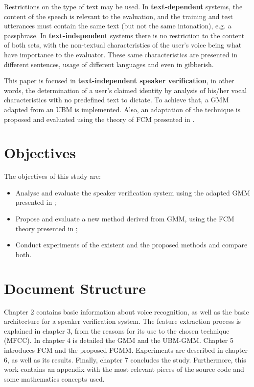 Restrictions on the type of text may be used. In \textbf{text-dependent} systems, the content of the speech is relevant to the evaluation, and the training and test utterances must contain the same text (but not the same intonation), e.g. a passphrase. In \textbf{text-independent} systems there is no restriction to the content of both sets, with the non-textual characteristics of the user's voice being what have importance to the evaluator. These same characteristics are presented in different sentences, usage of different languages and even in gibberish.

This paper is focused in \textbf{text-independent speaker verification}, in other words, the determination of a user's claimed identity by analysis of his/her vocal characteristics with no predefined text to dictate. To achieve that, a GMM adapted from an UBM \autocite{reynolds.quatieri.dunn.2000} is implemented. Also, an adaptation of the technique is proposed and evaluated using the theory of FCM presented in \autocite{gao.zhou.pu.2013}.

\section{Objectives}

The objectives of this study are:

\begin{itemize}\itemsep0pt
    \item Analyse and evaluate the speaker verification system using the adapted GMM presented in \autocite{reynolds.quatieri.dunn.2000};
    \item Propose and evaluate a new method derived from GMM, using the FCM theory presented in \autocite{gao.zhou.pu.2013};
    \item Conduct experiments of the existent and the proposed methods and compare both.
\end{itemize}

\section{Document Structure}

Chapter 2 contains basic information about voice recognition, as well as the basic architecture for a speaker verification system. The feature extraction process is explained in chapter 3, from the reasons for its use to the chosen technique (MFCC). In chapter 4 is detailed the GMM and the UBM-GMM. Chapter 5 introduces FCM and the proposed FGMM. Experiments are described in chapter 6, as well as its results. Finally, chapter 7 concludes the study. Furthermore, this work contains an appendix with the most relevant pieces of the source code and some mathematics concepts used.